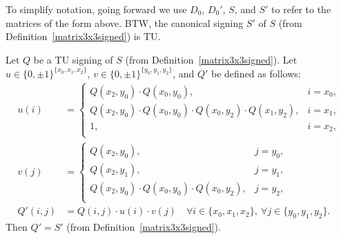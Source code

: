 \begin{definition}
\begin{center}
    \end{center}
    To simplify notation, going forward we use $D_{0}$, $D_{0}'$, $S$, and $S'$ to refer to the matrices of the form above.
    BTW, the canonical signing $S'$ of $S$ (from Definition~\ref{matrix3x3signed}) is TU.
\end{definition}

\begin{lemma}
    \label{Matrix.HasTuCanonicalSigning.toCanonicalSigning_submatrix3x3}
    \leanok
    Let $Q$ be a TU signing of $S$ (from Definition~\ref{matrix3x3signed}). Let $u \in \{0, \pm 1\}^{\{x_{0}, x_{1}, x_{2}\}}$, $v \in \{0, \pm 1\}^{\{y_{0}, y_{1}, y_{2}\}}$, and $Q'$ be defined as follows:
    \begin{align*}
        u(i) &= \begin{cases}
            Q (x_{2}, y_{0}) \cdot Q (x_{0}, y_{0}), & i = x_{0}, \\
            Q (x_{2}, y_{0}) \cdot Q (x_{0}, y_{0}) \cdot Q (x_{0}, y_{2}) \cdot Q (x_{1}, y_{2}), & i = x_{1}, \\
            1, & i = x_{2}, \\
        \end{cases} \\
        v(j) &= \begin{cases}
            Q (x_{2}, y_{0}), & j = y_{0}, \\
            Q (x_{2}, y_{1}), & j = y_{1}, \\
            Q (x_{2}, y_{0}) \cdot Q (x_{0}, y_{0}) \cdot Q (x_{0}, y_{2}), & j = y_{2}, \\
        \end{cases} \\
        Q' (i, j) &= Q (i, j) \cdot u(i) \cdot v(j) \quad \forall i \in \{x_{0}, x_{1}, x_{2}\}, \ \forall j \in \{y_{0}, y_{1}, y_{2}\}.
    \end{align*}
    Then $Q' = S'$ (from Definition~\ref{matrix3x3signed}).
\end{lemma}

